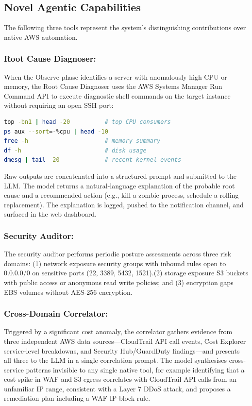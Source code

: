 \documentclass{ieeeaccess}
\begin{document}
\subsection{Novel Agentic Capabilities}

The following three tools represent the system's distinguishing contributions
over native AWS automation.
\begin{enumerate}
\subsubsection{Root Cause Diagnoser:}
When the Observe phase identifies a server with anomalously high CPU or memory,
the Root Cause Diagnoser uses the AWS Systems Manager Run Command API to
execute diagnostic shell commands on the target instance without requiring an
open SSH port:

\begin{lstlisting}[language=bash,
  caption={Diagnostic commands executed via SSM Run Command}]
top -bn1 | head -20          # top CPU consumers
ps aux --sort=-%cpu | head -10
free -h                      # memory summary
df -h                        # disk usage
dmesg | tail -20             # recent kernel events
\end{lstlisting}

Raw outputs are concatenated into a structured prompt and submitted to the
LLM. The model returns a natural-language explanation of the probable root
cause and a recommended action (e.g., kill a zombie process, schedule a
rolling replacement). The explanation is logged, pushed to the notification
channel, and surfaced in the web dashboard.

\subsubsection{Security Auditor:}
 The security auditor performs periodic posture assessments across three risk domains: (1) network exposure security groups with inbound rules open to 0.0.0.0/0 on sensitive ports (22, 3389, 5432, 1521).(2) storage exposure S3 buckets with public access or anonymous read write policies; and (3) encryption gaps EBS volumes without AES-256 encryption.

\subsubsection{Cross-Domain Correlator:}
Triggered by a significant cost anomaly, the correlator gathers evidence from
three independent AWS data sources---CloudTrail API call events, Cost Explorer
service-level breakdowns, and Security Hub/GuardDuty findings---and presents
all three to the LLM in a single correlation prompt. The model synthesises
cross-service patterns invisible to any single native tool, for example
identifying that a cost spike in WAF and S3 egress correlates with CloudTrail
API calls from an unfamiliar IP range, consistent with a Layer 7 DDoS attack,
and proposes a remediation plan including a WAF IP-block rule.
\end{enumerate}
\end{document}
